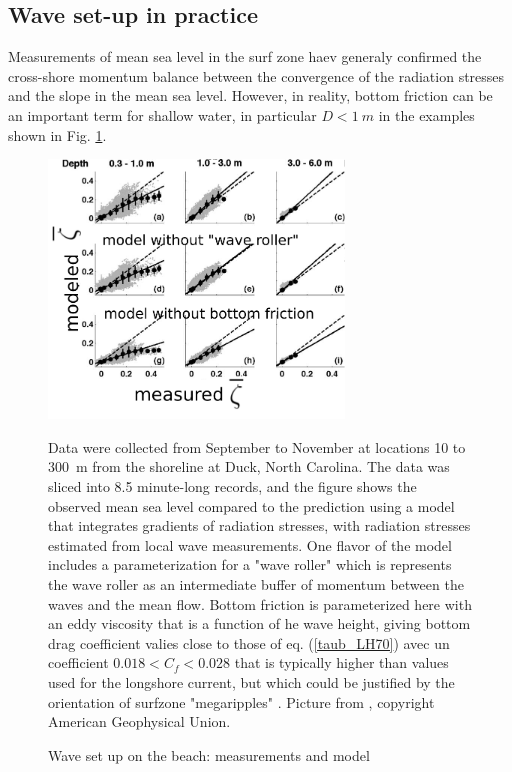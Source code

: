 \subsection{Wave set-up in practice}
Measurements of mean sea level in the surf zone haev generaly confirmed the cross-shore momentum balance between the convergence of the radiation stresses and the slope in the mean sea level. However, in reality, bottom friction can be an important term for shallow water, in particular $D < 1~m$ in the examples shown in Fig. \ref{Apotsos_setup}. 
\begin{figure}
\centerline{\includegraphics[width=0.7\textwidth]{FIGS_CH_NEARSHORE/Apotsos_setup.pdf}}
  \caption{Wave set up on the beach: measurements and model}
    {Data were collected from September to November at locations 10 to 300~m from the shoreline at Duck, North Carolina. The data was sliced into 8.5 minute-long records, and the figure shows the observed mean sea level compared to the prediction using a model that integrates gradients of radiation stresses, with radiation stresses estimated from local wave measurements. One flavor of the model includes a parameterization for a "wave roller" which is represents the wave roller as an intermediate buffer of momentum between the waves and the mean flow. Bottom friction is parameterized here with an eddy viscosity that is a function of he wave height, giving bottom drag coefficient valies close to those of eq. (\ref{taub_LH70}) 
avec un coefficient $0.018 <C_f< 0.028$
that is typically higher than values used for the longshore current, but which could be justified by the orientation of surfzone "megaripples" \citep{Gallagher&al.1998}. Picture from  \cite{Apotsos&al.2007}, copyright American Geophysical Union.}
\label{Apotsos_setup}
\end{figure}

